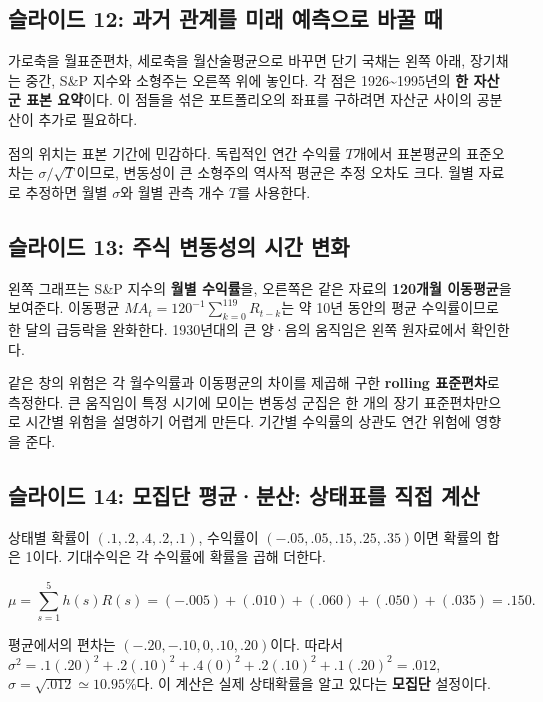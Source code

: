 \documentclass[11pt,a4paper]{article}
\begin{document}
\subsection{슬라이드 12: 과거 관계를 미래 예측으로 바꿀 때}

가로축을 월표준편차, 세로축을 월산술평균으로 바꾸면 단기 국채는 왼쪽 아래, 장기채는 중간, S\&P 지수와 소형주는 오른쪽 위에 놓인다. 각 점은 1926\textasciitilde{}1995년의 \textbf{한 자산군 표본 요약}이다. 이 점들을 섞은 포트폴리오의 좌표를 구하려면 자산군 사이의 공분산이 추가로 필요하다.
\par

점의 위치는 표본 기간에 민감하다. 독립적인 연간 수익률 $T$개에서 표본평균의 표준오차는 $\sigma/\sqrt T$이므로, 변동성이 큰 소형주의 역사적 평균은 추정 오차도 크다. 월별 자료로 추정하면 월별 $\sigma$와 월별 관측 개수 $T$를 사용한다.
\par

\subsection{슬라이드 13: 주식 변동성의 시간 변화}

왼쪽 그래프는 S\&P 지수의 \textbf{월별 수익률}을, 오른쪽은 같은 자료의 \textbf{120개월 이동평균}을 보여준다. 이동평균 $MA_t=120^{-1}\sum_{k=0}^{119}R_{t-k}$는 약 10년 동안의 평균 수익률이므로 한 달의 급등락을 완화한다. 1930년대의 큰 양·음의 움직임은 왼쪽 원자료에서 확인한다.
\par

같은 창의 위험은 각 월수익률과 이동평균의 차이를 제곱해 구한 \textbf{rolling 표준편차}로 측정한다. 큰 움직임이 특정 시기에 모이는 변동성 군집은 한 개의 장기 표준편차만으로 시간별 위험을 설명하기 어렵게 만든다. 기간별 수익률의 상관도 연간 위험에 영향을 준다.
\par

\subsection{슬라이드 14: 모집단 평균·분산: 상태표를 직접 계산}

상태별 확률이 $(.1,.2,.4,.2,.1)$, 수익률이 $(-.05,.05,.15,.25,.35)$이면 확률의 합은 1이다. 기대수익은 각 수익률에 확률을 곱해 더한다.
\par

\[
\mu=\sum_{s=1}^{5}h(s)R(s)=(-.005)+(.010)+(.060)+(.050)+(.035)=.150.
\]

평균에서의 편차는 $(-.20,-.10,0,.10,.20)$이다. 따라서 $\sigma^2=.1(.20)^2+.2(.10)^2+.4(0)^2+.2(.10)^2+.1(.20)^2=.012$, $\sigma=\sqrt{.012}\simeq10.95\%$다. 이 계산은 실제 상태확률을 알고 있다는 \textbf{모집단} 설정이다.
\par
\end{document}
